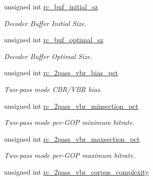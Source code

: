 \begin{DoxyCompactItemize}
unsigned int \hyperlink{structvpx__codec__enc__cfg_aa9e4d6405994ef42d61d478cf6e0d5e0}{rc\+\_\+buf\+\_\+initial\+\_\+sz}
\begin{DoxyCompactList}\small\item\em Decoder Buffer Initial Size. \end{DoxyCompactList}\item 
unsigned int \hyperlink{structvpx__codec__enc__cfg_aafde485867e040a58504ad796e79e47f}{rc\+\_\+buf\+\_\+optimal\+\_\+sz}
\begin{DoxyCompactList}\small\item\em Decoder Buffer Optimal Size. \end{DoxyCompactList}\item 
unsigned int \hyperlink{structvpx__codec__enc__cfg_a21c21ff097890dc3a450731c9b504cf4}{rc\+\_\+2pass\+\_\+vbr\+\_\+bias\+\_\+pct}
\begin{DoxyCompactList}\small\item\em Two-\/pass mode C\+B\+R/\+V\+BR bias. \end{DoxyCompactList}\item 
unsigned int \hyperlink{structvpx__codec__enc__cfg_a21eb9fce0844ae07b617bf3f0a25f5a5}{rc\+\_\+2pass\+\_\+vbr\+\_\+minsection\+\_\+pct}
\begin{DoxyCompactList}\small\item\em Two-\/pass mode per-\/\+G\+OP minimum bitrate. \end{DoxyCompactList}\item 
unsigned int \hyperlink{structvpx__codec__enc__cfg_ab5212050b71b2d9f4dc663caa496949e}{rc\+\_\+2pass\+\_\+vbr\+\_\+maxsection\+\_\+pct}
\begin{DoxyCompactList}\small\item\em Two-\/pass mode per-\/\+G\+OP maximum bitrate. \end{DoxyCompactList}\item 
unsigned int \hyperlink{structvpx__codec__enc__cfg_a8c205a9616aaa16b17dbd47e90d3b5b1}{rc\+\_\+2pass\+\_\+vbr\+\_\+corpus\+\_\+complexity}\hypertarget{structvpx__codec__enc__cfg_a8c205a9616aaa16b17dbd47e90d3b5b1}{}\label{structvpx__codec__enc__cfg_a8c205a9616aaa16b17dbd47e90d3b5b1}


\end{DoxyCompactItemize}

